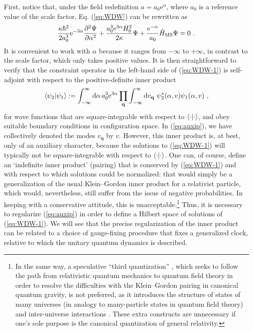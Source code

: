 \documentclass[12pt]{iopart}
\def\eq#1{\begin{equation}\begin{aligned}#1\end{aligned}\end{equation}}
\def\eref#1{(\ref{eq:#1})}
\def\D{\mathrm{d}}
\def\e{\mathrm{e}}
\def\del#1#2{\frac{\partial#1}{\partial#2}}
\def\q{\mathbf{q}}
\begin{document}
First, notice that, under the field redefinition $a = a_0\e^{\alpha}$, where $a_0$ is a reference value of the scale factor, Eq. \eref{WDW} can be rewritten as
\eq{\label{eq:WDW-1}
\frac{\kappa\hbar^2}{2a_0^3}\e^{-3\alpha}\del{^2\Psi}{\alpha^2}+\frac{a_0^3\e^{3\alpha}H_0^2}{2\kappa}\Psi+\frac{\e^{-\alpha}}{a_0}\hat{H}_{\rm MS}\Psi = 0 \ .
}
It is convenient to work with $\alpha$ because it ranges from $-\infty$ to $+\infty$, in contrast to the scale factor, which only takes positive values. It is then straightforward to verify that the constraint operator in the left-hand side of \eref{WDW-1} is self-adjoint with respect to the positive-definite inner product
\eq{\label{eq:auxip}
\braket{\psi_2|\psi_1} := \int_{-\infty}^{\infty}\D\alpha\,a_0^3\e^{3\alpha}\prod_{\q}\int_{-\infty}^{\infty}\D v_{\q}\ \psi_2^*(\alpha,v)\psi_1(\alpha,v) \ , 
}
for wave functions that are square-integrable with respect to $\braket{\cdot|\cdot}$, and obey suitable boundary conditions in configuration space. In \eref{auxip}, we have collectively denoted the modes $v_{\q}$ by $v$. However, this inner product is, at best, only of an auxiliary character, because the solutions to \eref{WDW-1} will typically not be square-integrable with respect to $\braket{\cdot|\cdot}$. One can, of course, define an `indefinite inner product' (pairing) that is conserved by \eref{WDW-1} and with respect to which solutions could be normalized: that would simply be a generalization of the usual Klein--Gordon inner product for a relativist particle, which would, nevertheless, still suffer from the issue of negative probabilities. In keeping with a conservative attitude, this is unacceptable.\footnote{In the same way, a speculative ``third quantization'' \citep{KucharNoSym,Giddings:1988wv,Coleman:1988tj,McGuigan:1988vi}, which seeks to follow the path from relativistic quantum mechanics to quantum field theory in order to resolve the difficulties with the Klein--Gordon pairing in canonical quantum gravity, is not preferred, as it introduces the structure of  states of many universes (in analogy to many-particle states in quantum field theory) and inter-universe interactions \citep{McGuigan:1988es}. These extra constructs are unnecessary if one's sole purpose is the canonical quantization of general relativity.} Thus, it is necessary to regularize \eref{auxip} in order to define a Hilbert space of solutions of \eref{WDW-1}. We will see that the precise regularization of the inner product can be related to a choice of gauge-fixing procedure that fixes a generalized clock, relative to which the unitary quantum dynamics is described.
\end{document}
